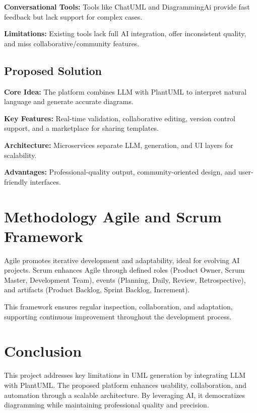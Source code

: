 \textbf{Conversational Tools:} Tools like ChatUML\cite{1} and DiagrammingAi\cite{2} provide fast feedback but lack support for complex cases.

\textbf{Limitations:} Existing tools lack full AI integration, offer inconsistent quality, and miss collaborative/community features.

\subsection{Proposed Solution}

\textbf{Core Idea:} The platform combines LLM with PlantUML to interpret natural language and generate accurate diagrams.

\textbf{Key Features:} Real-time validation, collaborative editing, version control support, and a marketplace for sharing templates.

\textbf{Architecture:} Microservices separate LLM, generation, and UI layers for scalability.

\textbf{Advantages:} Professional-quality output, community-oriented design, and user-friendly interfaces.


\section{Methodology Agile and Scrum Framework}

Agile promotes iterative development and adaptability, ideal for evolving AI projects. Scrum enhances Agile through defined roles (Product Owner, Scrum Master, Development Team), events (Planning, Daily, Review, Retrospective), and artifacts (Product Backlog, Sprint Backlog, Increment).

This framework ensures regular inspection, collaboration, and adaptation, supporting continuous improvement throughout the development process.


\section{Conclusion}
This project addresses key limitations in UML generation by integrating LLM with PlantUML.
The proposed platform enhances usability, collaboration, and automation through a scalable architecture.
By leveraging AI, it democratizes diagramming while maintaining professional quality and precision.
